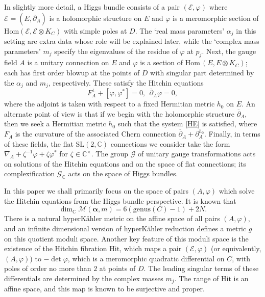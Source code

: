 \documentclass[12pt,letterpaper,reqno]{amsart}
\def\mathbf#1{#1}%
\theoremstyle{remark}
\theoremstyle{definition}
\numberwithin{thm}{section}
\numberwithin{equation}{section}
\numberwithin{figure}{section}
\newcommand{\cG}{\ensuremath{\mathcal G}}
\newcommand{\C}{\ensuremath{\mathbb C}}
\newcommand{\cE}{{\mathcal E}}
\newcommand{\del}{{\partial}}
\newcommand{\cMam}{\mathcal{M}(\boldsymbol{\alpha}, \mathbf{m})}
\begin{document}
In slightly more detail, a Higgs bundle consists of a pair $(\cE, \varphi)$ where $\cE = (E, \overline{\partial}_A)$ is a holomorphic structure on $E$ and $\varphi$ is a 
meromorphic section of $\mathrm{Hom}(\cE, \cE \otimes K_C)$ with simple poles at $D$. The `real mass parameters' $\alpha_j$ in this setting are extra data 
whose role will be explained later, while the `complex mass parameters' $m_j$ specify the eigenvalues of the residue of $\varphi$ at $p_j$.   Next, the gauge field $A$ is a unitary 
connection on $E$ and $\varphi$ is a section of $\mathrm{Hom}\,(E, E \otimes K_C)$; each has first order blowup at the points of $D$ with singular part 
determined by the $\alpha_j$ and $m_j$, respectively. These satisfy the Hitchin equations 
\begin{equation}
F_A^\perp + [\varphi, \varphi^*] = 0, \ \ \overline{\del}_A \varphi = 0,
\label{HE}
\end{equation}
where the adjoint is taken with respect to a fixed Hermitian metric $h_0$ on $E$.  An alternate point of view is that if we begin with the holomorphic structure
$\overline{\partial}_A$, then we seek a Hermitian metric $h_0$ such that the system \eqref{HE} is satisfied, where $F_A$ is the curvature of the associated Chern 
connection $\overline{\partial}_A + \partial_A^{h_0}$.  Finally, in terms of these fields, the flat $\mathrm{SL}(2,\C)$ connections
we consider take the form $\nabla_A + \zeta^{-1}\varphi + \zeta\varphi^*$ for $\zeta \in \C^\times$. The group $\cG$ of unitary gauge transformations acts on solutions of the Hitchin equations and
on the space of flat connections; its complexification $\cG_{\C}$ acts on the space of Higgs bundles. 

In this paper we shall primarily focus on the space of pairs $(A, \varphi)$ which solve the Hitchin equations from the Higgs bundle perspective. 
It is known that   
\begin{equation}
\dim_{\C} \cMam =  6(\mathrm{genus}(C)-1) + 2N.
\label{dimM}
\end{equation}
 There is a natural hyperK\"ahler metric on the affine space of all pairs $(A,\varphi)$, and an infinite dimensional 
version of hyperK\"ahler reduction defines a metric $g$ on this quotient moduli space.   Another key feature of this moduli space is the existence
of the Hitchin fibration $\mathrm{Hit}$, which maps a pair $(\cE, \varphi)$ (or equivalently, $(A,\varphi)$) to $-\det \varphi$, which is a meromorphic quadratic differential
on $C$, with poles of order no more than $2$ at points of $D$.  The leading singular terms of these differentials are determined by the
complex masses $m_j$. The range of $\mathrm{Hit}$ is an affine space, and this map is known to be surjective and proper. 
\end{document}
